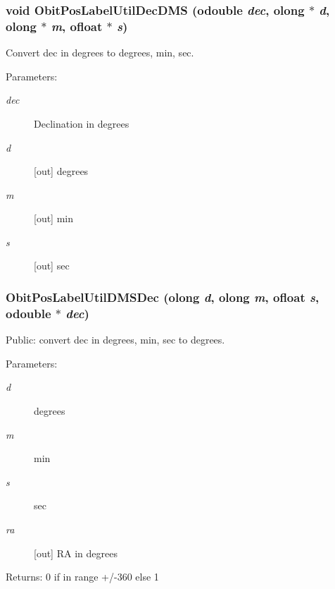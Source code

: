 \subsubsection{\setlength{\rightskip}{0pt plus 5cm}void Obit\-Pos\-Label\-Util\-Dec\-DMS ({\bf odouble} {\em dec}, {\bf olong} $\ast$ {\em d}, {\bf olong} $\ast$ {\em m}, {\bf ofloat} $\ast$ {\em s})}\label{ObitPosLabelUtil_8c_a4}


Convert dec in degrees to degrees, min, sec. 

\begin{Desc}
\item[Parameters:]
\begin{description}
\item[{\em dec}]Declination in degrees \item[{\em d}][out] degrees \item[{\em m}][out] min \item[{\em s}][out] sec \end{description}
\end{Desc}
\subsubsection{ Obit\-Pos\-Label\-Util\-DMSDec ({\bf olong} {\em d}, {\bf olong} {\em m}, {\bf ofloat} {\em s}, {\bf odouble} $\ast$ {\em dec})}\label{ObitPosLabelUtil_8c_a6}


Public: convert dec in degrees, min, sec to degrees. 

\begin{Desc}
\item[Parameters:]
\begin{description}
\item[{\em d}]degrees \item[{\em m}]min \item[{\em s}]sec \item[{\em ra}][out] RA in degrees \end{description}
\end{Desc}
\begin{Desc}
\item[Returns:]0 if in range +/-360 else 1 \end{Desc}
